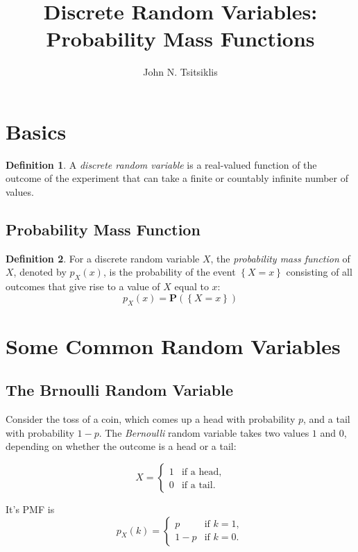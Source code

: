 \documentclass{tufte-handout}
\author{John N. Tsitsiklis}
\title{Discrete Random Variables: Probability Mass Functions}
\theoremstyle{definition} \newtheorem{definition}{Definition}
\theoremstyle{definition} \newtheorem{remark}{Remark}
\theoremstyle{definition} \newtheorem{example}{Example}
\newcommand{\prob}[1]{\mathbf{P}\left(#1\right)}
\newcommand{\pmf}[2]{p_#1\left(#2\right)}
\begin{document}
\maketitle
\section{Basics}
\begin{definition}
  A \emph{discrete random variable} is a real-valued function of the
  outcome of the experiment that can take a finite or countably infinite
  number of values.
\end{definition}

\subsection{Probability Mass Function}
\begin{definition}
  For a discrete random variable $X$, the \emph{probability mass function}
  of $X$, denoted by $\pmf{X}{x}$, is the probability of the event
  $\left\{ X = x \right\}$ consisting of all outcomes that give rise to a value of
  $X$ equal to $x$:
  \begin{equation*}
    \pmf{X}{x} = \prob{\left\{ X = x \right\}}
  \end{equation*}
\end{definition}

\section{Some Common Random Variables}
\subsection{The Brnoulli Random Variable}
Consider the toss of a coin, which comes up a head with probability $p$,
and a tail with probability $1 - p$. The \emph{Bernoulli} random
variable takes two values $1$ and $0$, depending on whether the outcome
is a head or a tail:

\begin{equation*}
  X =
  \begin{cases}
    1 & \text{if a head},\\
    0 & \text{if a tail}.
  \end{cases}
\end{equation*}

It's PMF is
\begin{equation*}
  \pmf{X}{k} =
  \begin{cases}
    p & \text{if } k = 1,\\
    1 - p & \text{if } k = 0.
  \end{cases}
\end{equation*}
\end{document}
